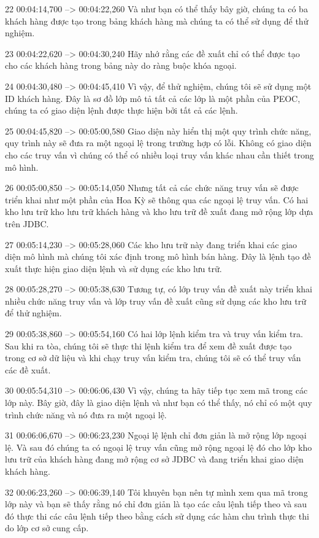 22
00:04:14,700 --> 00:04:22,260
Và như bạn có thể thấy bây giờ, chúng ta có ba khách hàng được tạo trong bảng khách hàng mà chúng ta có thể sử dụng để thử nghiệm.

23
00:04:22,620 --> 00:04:30,240
Hãy nhớ rằng các đề xuất chỉ có thể được tạo cho các khách hàng trong bảng này do ràng buộc khóa ngoại.

24
00:04:30,480 --> 00:04:45,410
Vì vậy, để thử nghiệm, chúng tôi sẽ sử dụng một ID khách hàng.  Đây là sơ đồ lớp mô tả tất cả các lớp là một phần của PEOC, chúng ta có giao diện lệnh được thực hiện bởi tất cả các lệnh.

25
00:04:45,820 --> 00:05:00,580
Giao diện này hiển thị một quy trình chức năng, quy trình này sẽ đưa ra một ngoại lệ trong trường hợp có lỗi.  Không có giao diện cho các truy vấn vì chúng có thể có nhiều loại truy vấn khác nhau cần thiết trong mô hình.

26
00:05:00,850 --> 00:05:14,050
Nhưng tất cả các chức năng truy vấn sẽ được triển khai như một phần của Hoa Kỳ sẽ thông qua các ngoại lệ truy vấn.  Có hai kho lưu trữ kho lưu trữ khách hàng và kho lưu trữ đề xuất đang mở rộng lớp dựa trên JDBC.

27
00:05:14,230 --> 00:05:28,060
Các kho lưu trữ này đang triển khai các giao diện mô hình mà chúng tôi xác định trong mô hình bán hàng.  Đây là lệnh tạo đề xuất thực hiện giao diện lệnh và sử dụng các kho lưu trữ.

28
00:05:28,270 --> 00:05:38,630
Tương tự, có lớp truy vấn đề xuất này triển khai nhiều chức năng truy vấn và lớp truy vấn đề xuất cũng sử dụng các kho lưu trữ để thử nghiệm.

29
00:05:38,860 --> 00:05:54,160
Có hai lớp lệnh kiểm tra và truy vấn kiểm tra.  Sau khi ra tòa, chúng tôi sẽ thực thi lệnh kiểm tra để xem đề xuất được tạo trong cơ sở dữ liệu và khi chạy truy vấn kiểm tra, chúng tôi sẽ có thể truy vấn các đề xuất.

30
00:05:54,310 --> 00:06:06,430
Vì vậy, chúng ta hãy tiếp tục xem mã trong các lớp này.  Bây giờ, đây là giao diện lệnh và như bạn có thể thấy, nó chỉ có một quy trình chức năng và nó đưa ra một ngoại lệ.

31
00:06:06,670 --> 00:06:23,230
Ngoại lệ lệnh chỉ đơn giản là mở rộng lớp ngoại lệ.  Và sau đó chúng ta có ngoại lệ truy vấn cũng mở rộng ngoại lệ đó cho lớp kho lưu trữ của khách hàng đang mở rộng cơ sở JDBC và đang triển khai giao diện khách hàng.

32
00:06:23,260 --> 00:06:39,140
Tôi khuyên bạn nên tự mình xem qua mã trong lớp này và bạn sẽ thấy rằng nó chỉ đơn giản là tạo các câu lệnh tiếp theo và sau đó thực thi các câu lệnh tiếp theo bằng cách sử dụng các hàm chu trình thực thi do lớp cơ sở cung cấp.

